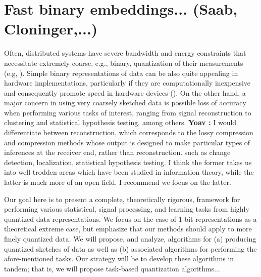 \documentclass{article}
\newcommand{\comment}[3]{{\color{#1} {\bf #2 :} #3}}
\newcommand{\yoav}[1]{\comment{magenta}{Yoav}{#1}}
\begin{document}
\section{Fast binary embeddings... (Saab, Cloninger,...)}
Often, distributed systems have severe bandwidth and energy constraints that necessitate extremely
coarse, e.g., binary, quantization of their measurements (e.g, \cite{Fang et al., 2014}). Simple binary representations of data can be also quite appealing in hardware implementations, particularly if they are computationally inexpensive and consequently promote speed in hardware devices (\cite{Jacques,Laska}). On the other hand, a major concern in using very coarsely sketched data is possible loss of accuracy when performing various tasks of interest, ranging from signal reconstruction to clustering and statistical hypothesis testing, among others. 
\yoav{I would differentiate between reconstruction, which corresponds to the lossy compression and compression methods whose output is designed to make particular types of inferences at the receiver end, rather than reconstruction. such as change detection, localization, statistical hypothesis testing. I think the former takes us into well trodden areas which have been studied in information theory, while the latter is much more of an open field. I recommend we focus on the latter.}

Our goal here is to present a complete, theoretically rigorous, framework for performing various statistical, signal processing, and learning tasks from highly quantized data representations. We focus on the case of 1-bit representations as a theoretical extreme case, but emphasize that our methods should apply to more finely quantized data. We will propose, and analyze, algorithms for (a) producing quantized sketches of data as well as (b) associated algorithms for performing the afore-mentioned tasks. Our strategy will be to develop these algorithms in tandem; that is, we will propose task-based quantization algorithms... 
\end{document}
